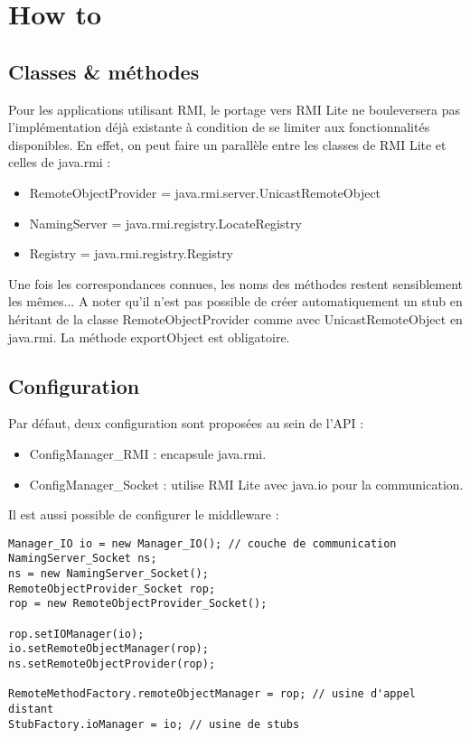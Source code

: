 \chapter{How to}

\section{Classes \& méthodes}
Pour les applications utilisant RMI, le portage vers RMI Lite ne bouleversera pas l'implémentation déjà existante à condition de se limiter aux fonctionnalités disponibles. En effet, on peut faire un parallèle entre les classes de RMI Lite et celles de java.rmi :
\begin{itemize}
\item RemoteObjectProvider = java.rmi.server.UnicastRemoteObject
\item NamingServer = java.rmi.registry.LocateRegistry
\item Registry = java.rmi.registry.Registry
\end{itemize}
\medskip

Une fois les correspondances connues, les noms des méthodes restent sensiblement les mêmes... A noter qu'il n'est pas possible de créer automatiquement un stub en héritant de la classe RemoteObjectProvider comme avec UnicastRemoteObject en java.rmi. La méthode exportObject est obligatoire.

\section{Configuration}
\hspace{-.6cm}Par défaut, deux configuration sont proposées au sein de l'API : 
\begin{itemize}
\item ConfigManager\_RMI : encapsule java.rmi.
\item ConfigManager\_Socket : utilise RMI Lite avec java.io pour la communication.
\end{itemize}
\medskip
Il est aussi possible de configurer le middleware :
\begin{lstlisting}
Manager_IO io = new Manager_IO(); // couche de communication
NamingServer_Socket ns;
ns = new NamingServer_Socket();
RemoteObjectProvider_Socket rop;
rop = new RemoteObjectProvider_Socket();

rop.setIOManager(io);
io.setRemoteObjectManager(rop);
ns.setRemoteObjectProvider(rop);

RemoteMethodFactory.remoteObjectManager = rop; // usine d'appel distant
StubFactory.ioManager = io; // usine de stubs
\end{lstlisting}

